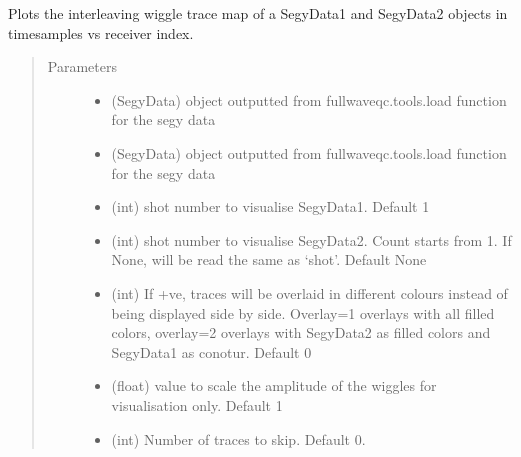 \documentclass[letterpaper,10pt,english]{sphinxmanual}
\begin{document}
\begin{fulllineitems}
\label{\detokenize{index:fullwaveqc.visual.interwiggle}}
Plots the interleaving wiggle trace map of a SegyData1 and SegyData2 objects in timesamples vs receiver index.
\begin{quote}\begin{description}
\item[{Parameters}] \leavevmode\begin{itemize}
\item {} 
 \textendash{} (SegyData)   object outputted from fullwaveqc.tools.load function for the segy data

\item {} 
 \textendash{} (SegyData)   object outputted from fullwaveqc.tools.load function for the segy data

\item {} 
 \textendash{} (int)        shot number to visualise SegyData1. Default 1

\item {} 
 \textendash{} (int)        shot number to visualise SegyData2. Count starts from 1. If None, will
be read the same as ‘shot’. Default None

\item {} 
 \textendash{} (int)        If +ve, traces will be overlaid in different colours instead of being
displayed side by side. Overlay=1 overlays with all filled colors, overlay=2
overlays with SegyData2 as filled colors and SegyData1 as conotur. Default 0

\item {} 
 \textendash{} (float)      value to scale the amplitude of the wiggles for visualisation only. Default 1

\item {} 
 \textendash{} (int)        Number of traces to skip. Default 0.


\end{itemize}
\end{description}
\end{quote}
\end{fulllineitems}
\end{document}
